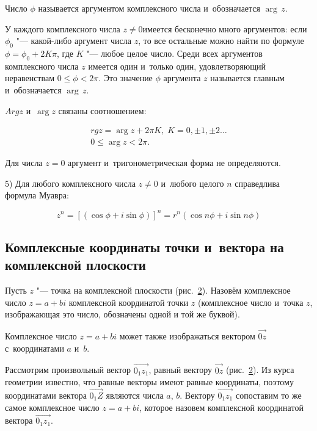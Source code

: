 \begin{figure}\label{fig:7_1_1}
\end{figure}

Число $\phi$ называется аргументом комплексного числа и~обозначается $\arg \, z$.

У каждого комплексного числа $z \ne 0$имеется бесконечно много аргументов:
если $\phi_{0}$ "--- какой-либо аргумент числа $z$, то все остальные можно найти по формуле
$\phi = \phi_{0} + 2K\pi$, где $K$ "--- любое целое число. Среди всех аргументов
комплексного числа $z$ имеется один и~только один, удовлетворяющий неравенствам
$0 \leqslant \phi < 2\pi$. Это значение $\phi$ аргумента $z$ называется главным
и~обозначается $\arg \, z$.

$Arg z$ и~$\arg z$ связаны соотношением:

\begin{gather}\label{eq:7_1_5}
rg z = \arg z + 2\pi K, \;  K = 0, \pm 1, \pm 2 \dots \\
0 \leqslant \arg z < 2\pi .
\end{gather}

Для числа $z = 0$ аргумент и~тригонометрическая форма не определяются.

5)\label{lst:7_1_5} Для любого комплексного числа $z \ne 0$ и~любого целого $n$
справедлива формула Муавра:

\begin{equation}\label{eq:7_1_5}
z^{n} = \left[ (\cos \phi + i \sin \phi) \right]^{n} =
r^{n} (\cos n\phi + i \sin n\phi)
\end{equation}


\subsection{Комплексные координаты точки и~вектора на комплексной плоскости}
Пусть $z$ "--- точка на комплексной плоскости (рис.\ \ref{fig:7_1_2}).
Назовём комплексное число $z = a + bi$ комплексной координатой точки $z$ 
(комплексное число и~точка $z$, изображающая это число, обозначены одной и той же буквой).

Комплексное число $z = a + bi$ может также изображаться вектором $\overrightarrow{0z}$
с~координатами $a$ и~$b$.

\begin{figure}\label{fig:7_1_2}
\end{figure}

Рассмотрим произвольный вектор $\overrightarrow{0_{1}z_{1}}$, равный вектору $\overrightarrow{0z}$
(рис.\ \ref{fig:7_1_2}). Из курса геометрии известно, что равные векторы имеют
равные координаты, поэтому координатами вектора $\overrightarrow{0_{1}Z}$ являются числа $a$, $b$.
Вектору $\overrightarrow{0_{1}z_{1}}$ сопоставим то же самое комплексное число $z = a + bi$,
которое назовем комплексной координатой вектора $\overrightarrow{0_{1}z_{1}}$.

